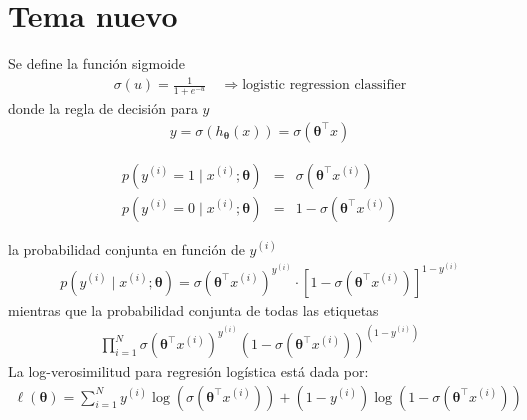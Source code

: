 \documentclass[12pt]{article}
\begin{document}
\section{Tema nuevo}

Se define la función sigmoide
\begin{eqnarray}
\sigma(u) = \frac{1}{1 + e^{-u}} \quad \Rightarrow \text{logistic regression classifier}
\end{eqnarray}
donde la regla de decisión para $y$
\begin{eqnarray}
y = \sigma(h_{\boldsymbol{\theta}}(x)) = \sigma(\boldsymbol{\theta}^{\top} x)
\end{eqnarray}

\begin{eqnarray}
p\left(y^{(i)} = 1 \mid x^{(i)}; \boldsymbol{\theta} \right) &=& \sigma(\boldsymbol{\theta}^{\top} x^{(i)})\\
p\left(y^{(i)} = 0 \mid x^{(i)}; \boldsymbol{\theta} \right) &=& 1 - \sigma(\boldsymbol{\theta}^{\top} x^{(i)})
\end{eqnarray}

la probabilidad conjunta en función de $y^{(i)}$
\begin{eqnarray}
p\left(y^{(i)} \mid x^{(i)}; \boldsymbol{\theta} \right) = 
\sigma(\boldsymbol{\theta}^{\top} x^{(i)})^{y^{(i)}} \cdot \left[1 - \sigma(\boldsymbol{\theta}^{\top} x^{(i)}) \right]^{1 - y^{(i)}}
\end{eqnarray}
mientras que la probabilidad conjunta de todas las etiquetas
\begin{eqnarray}
\prod_{i=1}^{N} \sigma(\boldsymbol{\theta}^{\top} x^{(i)})^{y^{(i)}} \left(1 - \sigma(\boldsymbol{\theta}^{\top} x^{(i)}) \right)^{(1 - y^{(i)})}
\end{eqnarray}
La log-verosimilitud para regresión logística está dada por:
\begin{eqnarray}
\ell(\boldsymbol{\theta}) = \sum_{i=1}^{N} y^{(i)} \log \left( \sigma(\boldsymbol{\theta}^{\top} x^{(i)}) \right) + 
(1 - y^{(i)}) \log \left( 1 - \sigma(\boldsymbol{\theta}^{\top} x^{(i)}) \right)
\end{eqnarray}
\end{document}

